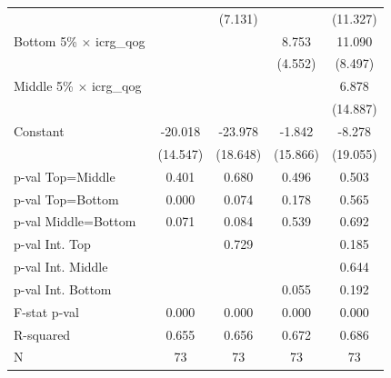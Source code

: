 \begin{tabular}{l*{4}{c}}
                    &            &     (7.131)&            &    (11.327)\\
\addlinespace
Bottom 5\% $\times$ icrg\_qog&            &            &       8.753&      11.090\\
                    &            &            &     (4.552)&     (8.497)\\
\addlinespace
Middle 5\% $\times$ icrg\_qog&            &            &            &       6.878\\
                    &            &            &            &    (14.887)\\
\addlinespace
Constant            &     -20.018&     -23.978&      -1.842&      -8.278\\
                    &    (14.547)&    (18.648)&    (15.866)&    (19.055)\\
\midrule
p-val Top=Middle    &       0.401&       0.680&       0.496&       0.503\\
p-val Top=Bottom    &       0.000&       0.074&       0.178&       0.565\\
p-val Middle=Bottom &       0.071&       0.084&       0.539&       0.692\\
p-val Int. Top      &            &       0.729&            &       0.185\\
p-val Int. Middle   &            &            &            &       0.644\\
p-val Int. Bottom   &            &            &       0.055&       0.192\\
F-stat p-val        &       0.000&       0.000&       0.000&       0.000\\
R-squared           &       0.655&       0.656&       0.672&       0.686\\
N                   &          73&          73&          73&          73\\
\bottomrule
\end{tabular}
